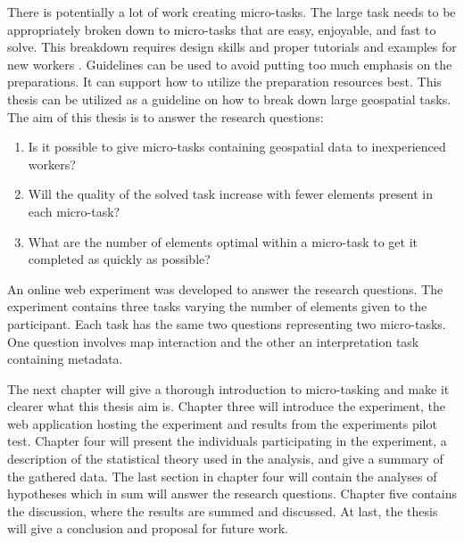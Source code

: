 There is potentially a lot of work creating micro-tasks. The large task needs to be appropriately broken down to micro-tasks that are easy, enjoyable, and fast to solve. This breakdown requires design skills and proper tutorials and examples for new workers \citep{Schulze2012}. 
Guidelines can be used to avoid putting too much emphasis on the preparations. It can support how to utilize the preparation resources best. This thesis can be utilized as a guideline on how to break down large geospatial tasks.\\

The aim of this thesis is to answer the research questions: 
\begin{enumerate}
	\item Is it possible to give micro-tasks containing geospatial data to inexperienced workers?
	\item Will the quality of the solved task increase with fewer elements present in each micro-task?
	\item What are the number of elements optimal within a micro-task to get it completed as quickly as possible?
\end{enumerate}
\vspace{0.3cm}
An online web experiment was developed to answer the research questions. The experiment contains three tasks varying the number of elements given to the participant. Each task has the same two questions representing two micro-tasks. One question involves map interaction and the other an interpretation task containing metadata. 

The next chapter will give a thorough introduction to micro-tasking and make it clearer what this thesis aim is. Chapter three will introduce the experiment, the web application hosting the experiment and results from the experiments pilot test. Chapter four will present the individuals participating in the experiment, a description of the statistical theory used in the analysis, and give a summary of the gathered data. The last section in chapter four will contain the analyses of hypotheses which in sum will answer the research questions. Chapter five contains the discussion, where the results are summed and discussed. At last, the thesis will give a conclusion and proposal for future work.
 
